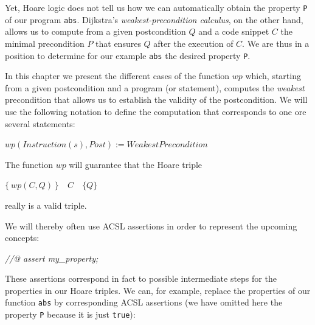 \documentclass[12pt,francais,]{scrbook}
\newenvironment{Shaded}{}{}
\newcommand{\CommentTok}[1]{\textcolor[rgb]{0.38,0.63,0.69}{\textit{{#1}}}}
\begin{document}
Yet, Hoare logic does not tell us how we can automatically obtain the
property \texttt{P} of our program \texttt{abs}. Dijkstra's
\emph{weakest-precondition calculus}, on the other hand, allows us to
compute from a given postcondition \(Q\) and a code snippet \(C\) the
minimal precondition \(P\) that ensures \(Q\) after the execution of
\(C\). We are thus in a position to determine for our example
\texttt{abs} the desired property \texttt{P}.

In this chapter we present the different cases of the function \(wp\)
which, starting from a given postcondition and a program (or statement),
computes the \emph{weakest} precondition that allows us to establish the
validity of the postcondition. We will use the following notation to
define the computation that corresponds to one ore several statements:

\(wp(Instruction(s), Post) := WeakestPrecondition\)

\clearpage
The function \(wp\) will guarantee that the Hoare triple

\begin{center} \(\{\ wp(C,Q)\ \}\quad C\quad \{ Q \}\) \end{center}

really is a valid triple.

We will thereby often use ACSL assertions in order to represent the
upcoming concepts:

\begin{footnotesize}\begin{Shaded}
\begin{Highlighting}[]
\CommentTok{//@ assert my_property;}
\end{Highlighting}
\end{Shaded}\end{footnotesize}

These assertions correspond in fact to possible intermediate steps for
the properties in our Hoare triples. We can, for example, replace the
properties of our function \texttt{abs} by corresponding ACSL assertions
(we have omitted here the property \texttt{P} because it is just
\texttt{true}):
\end{document}
